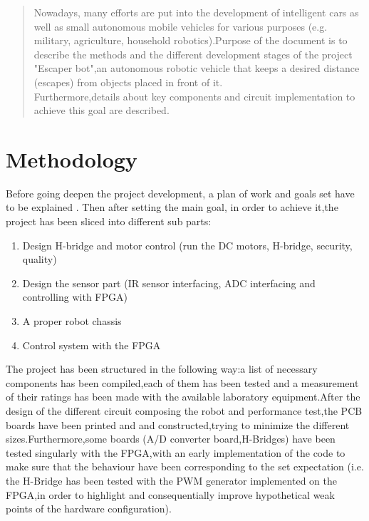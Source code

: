 \label{Abstract}
\begin{abstract}

Nowadays, many efforts are put into the development of intelligent cars as well as small autonomous mobile vehicles for various purposes (e.g. military, agriculture, household robotics).Purpose of the document is to describe the methods and the different development stages of  the project "Escaper bot",an autonomous robotic vehicle  that keeps a desired distance (escapes) from objects placed in front of it. 
\\
Furthermore,details about key components and circuit implementation to achieve this goal are described. 
\end{abstract}

\section{Methodology}
Before going deepen the project development, a plan of work and goals set have to be explained . Then after setting the main goal, in order to achieve it,the project has been sliced into different sub parts:

\begin{enumerate}
  \item Design H-bridge and motor control (run the DC motors, H-bridge, security, quality)
  \item Design the sensor part (IR sensor interfacing, ADC interfacing and controlling with FPGA)
  \item A proper robot chassis
  \item Control system with the FPGA
\end{enumerate}

The project has been structured in the following way:a list of necessary components has been compiled,each of them has been tested and a measurement of their ratings has been made with the available laboratory equipment.After the design of the different circuit composing the robot and performance test,the PCB boards have been printed and and constructed,trying to minimize the different sizes.Furthermore,some boards (A/D converter board,H-Bridges) have been tested singularly with the FPGA,with an early implementation of the code to make sure that the behaviour have been corresponding to the set expectation (i.e. the H-Bridge has been tested with the PWM generator implemented on the FPGA,in order to highlight and consequentially improve hypothetical weak points of the hardware configuration).


